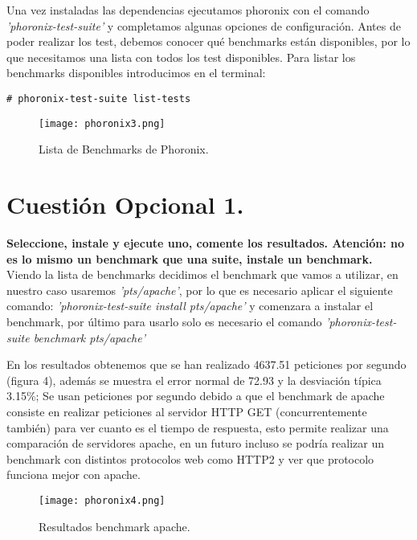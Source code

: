 \documentclass[a4paper, 10pt]{article} %
\begin{document}
Una vez instaladas las dependencias ejecutamos phoronix con el comando \textit{'phoronix-test-suite'} y completamos algunas opciones de configuración\cite{3}. Antes de poder realizar los test, debemos conocer qué benchmarks están disponibles, por lo que necesitamos una lista con todos los test disponibles. Para listar los benchmarks disponibles introducimos en el terminal: 
\begin{verbatim}
# phoronix-test-suite list-tests
\end{verbatim}

\begin{figure}[H]
\centering 
\texttt{[image: phoronix3.png]} 
\caption{Lista de Benchmarks de Phoronix.} 
\label{contexto:figura} 
\end{figure}

\section{Cuestión Opcional 1.}
\textbf{Seleccione, instale y ejecute uno, comente los resultados. Atención: no es lo mismo un benchmark que una suite, instale un benchmark.}\\

Viendo la lista de benchmarks decidimos el benchmark que vamos a utilizar\cite{4}, en nuestro caso usaremos \textit{'pts/apache'}, por lo que es necesario aplicar el siguiente comando: \textit{'phoronix-test-suite install pts/apache'} y comenzara a instalar el benchmark, por último para usarlo solo es necesario el comando \textit{'phoronix-test-suite benchmark pts/apache'}

En los resultados obtenemos que se han realizado 4637.51 peticiones por segundo (figura 4), además se muestra el error normal de 72.93 y la desviación típica 3.15\%; Se usan peticiones por segundo debido a que el benchmark de apache consiste en realizar peticiones al servidor HTTP GET (concurrentemente también) para ver cuanto es el tiempo de respuesta, esto permite realizar una comparación de servidores apache, en un futuro incluso se podría realizar un benchmark con distintos protocolos web como HTTP2 y ver que protocolo funciona mejor con apache.

\begin{figure}[H]
\centering 
\texttt{[image: phoronix4.png]} 
\caption{Resultados benchmark apache.} 
\label{contexto:figura} 
\end{figure}

\pagebreak
\end{document}
